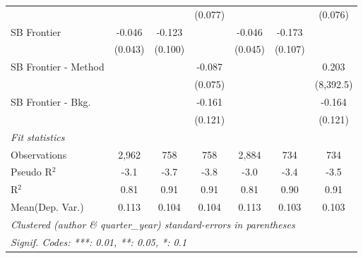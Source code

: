\begin{tabular}{lcccccc}
                        &               &         & (0.077)       &               &         & (0.076)\\   
   SB Frontier          & -0.046        & -0.123  &               & -0.046        & -0.173  &   \\   
                        & (0.043)       & (0.100) &               & (0.045)       & (0.107) &   \\   
   SB Frontier - Method &               &         & -0.087        &               &         & 0.203\\   
                        &               &         & (0.075)       &               &         & (8,392.5)\\   
   SB Frontier - Bkg.   &               &         & -0.161        &               &         & -0.164\\   
                        &               &         & (0.121)       &               &         & (0.121)\\   
   \midrule
   \emph{Fit statistics}\\
   Observations         & 2,962         & 758     & 758           & 2,884         & 734     & 734\\  
   Pseudo R$^2$         & -3.1          & -3.7    & -3.8          & -3.0          & -3.4    & -3.5\\  
   R$^2$                & 0.81          & 0.91    & 0.91          & 0.81          & 0.90    & 0.91\\  
Mean(Dep. Var.) & 0.113 & 0.104 & 0.104 & 0.113 & 0.103 & 0.103 \\
   \midrule \midrule
   \multicolumn{7}{l}{\emph{Clustered (author \& quarter\_year) standard-errors in parentheses}}\\
   \multicolumn{7}{l}{\emph{Signif. Codes: ***: 0.01, **: 0.05, *: 0.1}}\\
\end{tabular}
\par\endgroup
